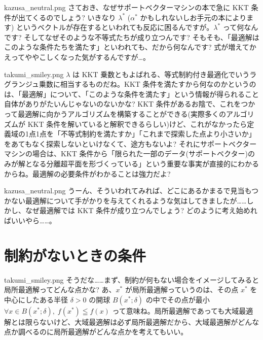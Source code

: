 \documentclass[b5paper,xelatex,ja=standard,10pt]{bxjsarticle}
\begin{document}
\begin{SERIFU}[colback=PaleIris, colbacktitle=PaleIris2]{kazusa_neutral.png}
さておき、なぜサポートベクターマシンの本で急に KKT 条件が出てくるのでしょう? いきなり $\lambda^\ast$ ($\alpha^\ast$ かもしれないしお手元の本によります) というベクトルが存在するといわれても反応に困るんですが。$\lambda^\ast$ って何なんです? そしてなぜそのような不等式たちが成り立つんです? そもそも、「最適解はこのような条件たちを満たす」といわれても、だから何なんです? 式が増えてかえってややこしくなった気がするんですが…。
\end{SERIFU}

\begin{SERIFU}[colback=PaleGold, colbacktitle=PaleGold2]{takumi_smiley.png}
$\lambda$ は KKT 乗数ともよばれる、等式制約付き最適化でいうラグランジュ乗数に相当するものだね。KKT 条件を満たすから何なのかというのは、「最適解」について、「このような条件を満たす」という情報が得られること自体がありがたいんじゃないのないかな? KKT 条件があるお陰で、これをつかって最適解に向かうアルゴリズムを構築することができる(実際多くのアルゴリズムが KKT 条件を解いていると解釈できるらしい)けど、これがなかったら定義域の1点1点を「不等式制約を満たすか」「これまで探索した点より小さいか」をあてもなく探索しないといけなくて、途方もないよ? それにサポートベクターマシンの場合は、KKT 条件から「限られた一部のデータ(サポートベクター)のみが解となる分離超平面を形づくっている」という重要な事実が直接的にわかるからね。最適解の必要条件がわかることは強力だよ?
\end{SERIFU}

\begin{SERIFU}[colback=PaleIris, colbacktitle=PaleIris2]{kazusa_neutral.png}
うーん、そういわれてみれば、どこにあるかまるで見当もつかない最適解について手がかりを与えてくれるような気はしてきましたが……しかし、なぜ最適解では KKT 条件が成り立つんでしょう? どのように考え始めればいいやら……。
\end{SERIFU}


\renewcommand*{\mysectiontitle}{制約がないときの条件}
\section*{\mysectiontitle}
\addcontentsline{toc}{section}{\mysectiontitle}
\vspace{3pt}

\begin{SERIFU}[colback=PaleGold, colbacktitle=PaleGold2]{takumi_smiley.png}
そうだな……まず、制約が何もない場合をイメージしてみると局所最適解ってどんな点かな? あ、$x^\ast$ が局所最適解っていうのは、その点 $x^\ast$ を中心にしたある半径 $\delta > 0$ の開球 $ B(x^\ast; \delta)$ の中でその点が最小 $ \forall x \in B(x^\ast; \delta), \; f(x^\ast) \leqq f(x)$ って意味ね。局所最適解であっても大域最適解とは限らないけど、大域最適解は必ず局所最適解だから、大域最適解がどんな点か調べるのに局所最適解がどんな点かを考えてもいい。
\end{SERIFU}
\end{document}

